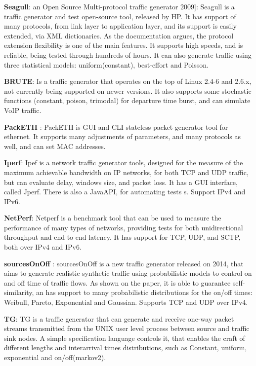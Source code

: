 \textbf{Seagull}\cite{wp-seagull}\cite{web-seagull}: an Open Source Multi-protocol traffic generator 2009]: Seagull is a traffic generator and test open-source tool, released by HP. 
It has support of many protocols, from link layer to application layer, and its support is easily extended, via XML dictionaries. As the documentation argues, the protocol extension flexibility is one of the main features. It supports high speeds, and is reliable, being tested through hundreds of hours. 
It can also generate traffic using three statistical models: uniform(constant), best-effort and Poisson. 


\textbf{BRUTE}\cite{web-brute}: Is a traffic generator that operates on the top of Linux 2.4-6 and 2.6.x, not currently being supported on newer versions. It also supports some stochastic functions (constant, poison, trimodal) for departure time burst, and can simulate VoIP traffic.


\textbf{PackETH} \cite{web-packeth}: PackETH is GUI and CLI stateless packet generator tool for ethernet. It supports many adjustments of parameters, and many protocols as well, and can set MAC addresses.  

\textbf{Iperf}\cite{web-iperf}: Ipef is a network traffic generator tools, designed for the measure of the maximum achievable bandwidth on IP networks, for both TCP and UDP traffic, but can evaluate delay, windows size, and packet loss. It has a GUI interface, called Jperf\cite{web-jperf}. There is also a JavaAPI, for automating tests s\cite{jperf-git}. Support IPv4 and IPv6.


\textbf{NetPerf}\cite{web-netperf}: Netperf is a benchmark tool that can be used to measure the performance of many types of networks, providing tests for both unidirectional throughput and end-to-end latency. It has support for TCP, UDP, and \acrshort{SCTP}, both over IPv4 and IPv6. 


\textbf{sourcesOnOff}\cite{sourcesonoff-paper} \cite{web-sourcesonoff}:  sourcesOnOff is a new traffic generator released on 2014, that aims to generate realistic synthetic traffic using probabilistic models to control on and off time of traffic flows. As shown on the paper, it is able to guarantee self-similarity, an has support to many probabilistic distributions for the on/off times: Weibull, Pareto, Exponential and Gaussian. Supports TCP and UDP over IPv4.


\textbf{TG}\cite{web-tg}: TG is a traffic generator that can generate and receive one-way packet streams transmitted from the UNIX user level process between source and traffic sink nodes. A simple specification language controls it, that enables the craft of different lengths and interarrival times distributions, such as Constant, uniform, exponential and on/off(markov2). 

